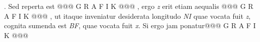                    . Sed reperta est @@@ G R A F I K @@@%
                    ,  ergo \textit{z} erit etiam aequalis @@@ G R A F I K @@@%
                    ,  ut itaque inveniatur desiderata longitudo \textit{NI} quae vocata  fuit \textit{z}, cognita sumenda est \textit{BF}, quae vocata fuit \textit{x}.  Si ergo jam ponatur\pend \pstart @@@ G R A F I K @@@%
                     